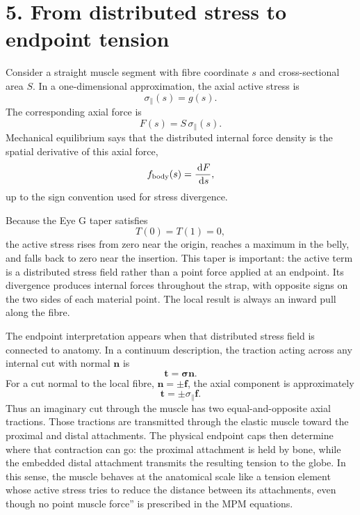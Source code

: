 \documentclass[11pt]{article}
\newcommand{\dd}{\,\mathrm d}
\newcommand{\vect}[1]{\bm{#1}}
\newcommand{\sig}{\boldsymbol{\sigma}}
\begin{document}
\section*{5. From distributed stress to endpoint tension}
Consider a straight muscle segment with fibre coordinate $s$ and cross-sectional area $S$. In a one-dimensional approximation, the axial active stress is
\begin{equation}
\sigma_{\parallel}(s)=g(s).
\label{eq:auto12}
\end{equation}
The corresponding axial force is
\begin{equation}
F(s)=S\,\sigma_{\parallel}(s).
\label{eq:auto13}
\end{equation}
Mechanical equilibrium says that the distributed internal force density is the spatial derivative of this axial force,
\begin{equation}
f_{\rm body}(s)=\frac{\dd F}{\dd s},
\label{eq:auto14}
\end{equation}
up to the sign convention used for stress divergence.

Because the Eye G taper satisfies
\begin{equation}
T(0)=T(1)=0,
\label{eq:auto15}
\end{equation}
the active stress rises from zero near the origin, reaches a maximum in the belly, and falls back to zero near the insertion. This taper is important: the active term is a distributed stress field rather than a point force applied at an endpoint. Its divergence produces internal forces throughout the strap, with opposite signs on the two sides of each material point. The local result is always an inward pull along the fibre.

The endpoint interpretation appears when that distributed stress field is connected to anatomy. In a continuum description, the traction acting across any internal cut with normal $\vect n$ is
\begin{equation}
\vect t=\sig\vect n.
\label{eq:auto16}
\end{equation}
For a cut normal to the local fibre, $\vect n=\pm\vect f$, the axial component is approximately
\begin{equation}
\vect t=\pm\sigma_{\parallel}\vect f.
\label{eq:auto17}
\end{equation}
Thus an imaginary cut through the muscle has two equal-and-opposite axial tractions. Those tractions are transmitted through the elastic muscle toward the proximal and distal attachments. The physical endpoint caps then determine where that contraction can go: the proximal attachment is held by bone, while the embedded distal attachment transmits the resulting tension to the globe. In this sense, the muscle behaves at the anatomical scale like a tension element whose active stress tries to reduce the distance between its attachments, even though no point muscle force'' is prescribed in the MPM equations.
\end{document}
